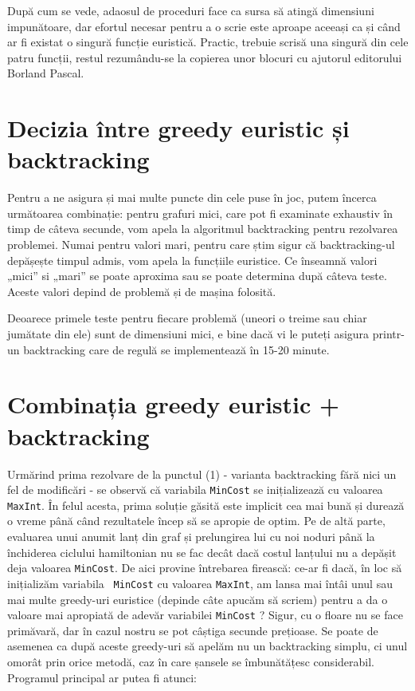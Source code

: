 După cum se vede, adaosul de proceduri face ca sursa să atingă dimensiuni
impunătoare, dar efortul necesar pentru a o scrie este aproape aceeași ca și
când ar fi existat o singură funcție euristică. Practic, trebuie scrisă una
singură din cele patru funcții, restul rezumându-se la copierea unor blocuri
cu ajutorul editorului Borland Pascal.

\section{Decizia între greedy euristic și backtracking}

Pentru a ne asigura și mai multe puncte din cele puse în joc, putem încerca
următoarea combinație: pentru grafuri mici, care pot fi examinate exhaustiv în
timp de câteva secunde, vom apela la algoritmul backtracking pentru rezolvarea
problemei. Numai pentru valori mari, pentru care știm sigur că backtracking-ul
depășește timpul admis, vom apela la funcțiile euristice. Ce înseamnă valori
„mici” si „mari” se poate aproxima sau se poate determina după câteva
teste. Aceste valori depind de problemă și de mașina folosită.

Deoarece primele teste pentru fiecare problemă (uneori o treime sau chiar
jumătate din ele) sunt de dimensiuni mici, e bine dacă vi le puteți asigura
printr-un backtracking care de regulă se implementează în 15-20 minute.

\section{Combinația greedy euristic + backtracking}

Urmărind prima rezolvare de la punctul (1) - varianta backtracking fără nici
un fel de modificări - se observă că variabila {\tt MinCost} se inițializează
cu valoarea {\tt MaxInt}. În felul acesta, prima soluție găsită este implicit
cea mai bună și durează o vreme până când rezultatele încep să se apropie de
optim. Pe de altă parte, evaluarea unui anumit lanț din graf și prelungirea
lui cu noi noduri până la închiderea ciclului hamiltonian nu se fac decât dacă
costul lanțului nu a depășit deja valoarea {\tt MinCost}. De aici provine
întrebarea firească: ce-ar fi dacă, în loc să inițializăm variabila {\tt
  MinCost} cu valoarea {\tt MaxInt}, am lansa mai întâi unul sau mai multe
greedy-uri euristice (depinde câte apucăm să scriem) pentru a da o valoare mai
apropiată de adevăr variabilei {\tt MinCost} ? Sigur, cu o floare nu se face
primăvară, dar în cazul nostru se pot câștiga secunde prețioase. Se poate de
asemenea ca după aceste greedy-uri să apelăm nu un backtracking simplu, ci
unul omorât prin orice metodă, caz în care șansele se îmbunătățesc
considerabil. Programul principal ar putea fi atunci:

